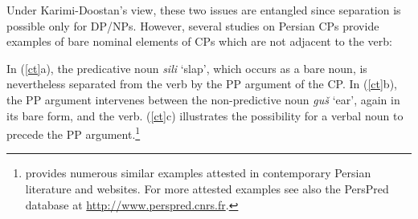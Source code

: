\documentclass[output=paper]{langsci/langscibook}
\begin{document}
Under Karimi-Doostan's view, these two issues are entangled since separation is possible only for DP/NPs. However, several studies on Persian CPs provide examples of bare nominal elements of CPs which are not adjacent to the verb:


\begin{exe}
	\ex\label{ct}
	\begin{xlist}		
		
		
		
	\end{xlist}
\end{exe}

In (\ref{ct}a), the predicative noun \textit{sili} `slap', which occurs as a bare noun, is nevertheless separated from the verb by the PP argument of the CP. In (\ref{ct}b), the PP argument intervenes between the non-predictive noun  \textit{gu\v{s}} `ear',  again in its bare form, and the verb. (\ref{ct}c) illustrates the possibility for a verbal noun to precede the PP argument.\footnote{\citet{Samvelian2012} provides numerous similar examples attested in contemporary Persian literature and websites. For more attested examples see also the PersPred database at \url{http://www.perspred.cnrs.fr}.}
\end{document}
